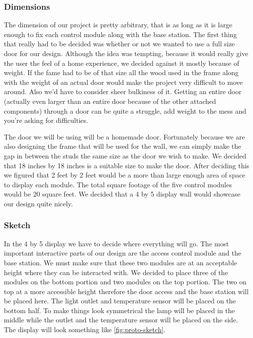 \subsubsection{Dimensions} The dimension of our project is pretty arbitrary,
that is as long as it is large enough to fix each control module along with the
base station. The first thing that really had to be decided was whether or not
we wanted to use a full size door for our design. Although the idea was
tempting, because it would really give the user the feel of a home experience,
we decided against it mostly because of weight. If the fame had to be of that
size all the wood used in the frame along with the weight of an actual door
would make the project very difficult to move around. Also we{}'d have to
consider sheer bulkiness of it. Getting an entire door (actually even larger
than an entire door because of the other attached components) through a door
can be quite a struggle, add weight to the mess and you{}'re asking for
difficulties.

The door we will be using will be a homemade door. Fortunately
because we are also designing the frame that will be used for the wall, we can
simply make the gap in between the studs the same size as the door we wish to
make. We decided that 18 inches by 18 inches is a suitable size to make the
door. After deciding this we figured that 2 feet by 2 feet would be a more than
large enough area of space to display each module. The total square footage of
the five control modules would be 20 square feet. We decided that a 4 by 5
display wall would showcase our design quite nicely.

\subsubsection{Sketch} In the 4 by 5 display we have to decide where everything
will go. The most important interactive parts of our design are the access
control module and the base station. We must make sure that these two modules
are at an acceptable height where they can be interacted with. We decided to
place three of the modules on the bottom portion and two modules on the top
portion. The two on top at a more accessible height therefore the door access
and the base station will be placed here. The light outlet and temperature
sensor will be placed on the bottom half. To make things look symmetrical the
lamp will be placed in the middle while the outlet and the temperature sensor
will be placed on the side. The display will look something like \autoref{fig:proto-sketch}.

